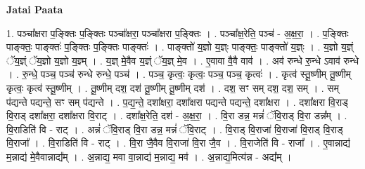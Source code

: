 \documentclass[17pt]{extarticle}
\begin{document}
\textbf{Jatai Paata} \newline

1. पञ्चा᳚क्षरा प॒ङ्क्तिः प॒ङ्क्तिः पञ्चा᳚क्षरा॒ पञ्चा᳚क्षरा प॒ङ्क्तिः । . पञ्चा᳚क्ष॒रेति॒ पञ्च॑ - अ॒क्ष॒रा॒ । . प॒ङ्क्तिः पाङ्क्तः॒ पाङ्क्तः॑ प॒ङ्क्तिः प॒ङ्क्तिः पाङ्क्तः॑ । . पाङ्क्तो॑ य॒ज्ञो य॒ज्ञ्ः पाङ्क्तः॒ पाङ्क्तो॑ य॒ज्ञ्ः । . य॒ज्ञो य॒ज्ञ्ं ॅय॒ज्ञ्ं ॅय॒ज्ञो य॒ज्ञो य॒ज्ञ्म् । . य॒ज्ञ् मे॒वैव य॒ज्ञ्ं ॅय॒ज्ञ् मे॒व । . ए॒वावा वै॒वै वाव॑ । . अव॑ रुन्धे रु॒न्धे ऽवाव॑ रुन्धे । . रु॒न्धे॒ पञ्च॒ पञ्च॑ रुन्धे रुन्धे॒ पञ्च॑ । . पञ्च॒ कृत्वः॒ कृत्वः॒ पञ्च॒ पञ्च॒ कृत्वः॑ । . कृत्व॑ स्तू॒ष्णीम् तू॒ष्णीम् कृत्वः॒ कृत्व॑ स्तू॒ष्णीम् । . तू॒ष्णीम् दश॒ दश॑ तू॒ष्णीम् तू॒ष्णीम् दश॑ । . दश॒ सꣳ सम् दश॒ दश॒ सम् । . सम् प॑द्यन्ते पद्यन्ते॒ सꣳ सम् प॑द्यन्ते । . प॒द्य॒न्ते॒ दशा᳚क्षरा॒ दशा᳚क्षरा पद्यन्ते पद्यन्ते॒ दशा᳚क्षरा । . दशा᳚क्षरा वि॒राड् वि॒राड् दशा᳚क्षरा॒ दशा᳚क्षरा वि॒राट् । . दशा᳚क्ष॒रेति॒ दश॑ - अ॒क्ष॒रा॒ । . वि॒रा डन्न॒ मन्नं॑ ॅवि॒राड् वि॒रा डन्न᳚म् । . वि॒राडिति॑ वि - राट् । . अन्नं॑ ॅवि॒राड् वि॒रा डन्न॒ मन्नं॑ ॅवि॒राट् । . वि॒राड् वि॒राजा॑ वि॒राजा॑ वि॒राड् वि॒राड् वि॒राजा᳚ । . वि॒राडिति॑ वि - राट् । . वि॒रा जै॒वैव वि॒राजा॑ वि॒रा जै॒व । . वि॒राजेति॑ वि - राजा᳚ । . ए॒वान्नाद्य॑ म॒न्नाद्य॑ मे॒वैवान्नाद्य᳚म् । . अ॒न्नाद्य॒ मवा वा॒न्नाद्य॑ म॒न्नाद्य॒ मव॑ । . अ॒न्नाद्य॒मित्य॑न्न - अद्य᳚म् । \newline
\end{document}
